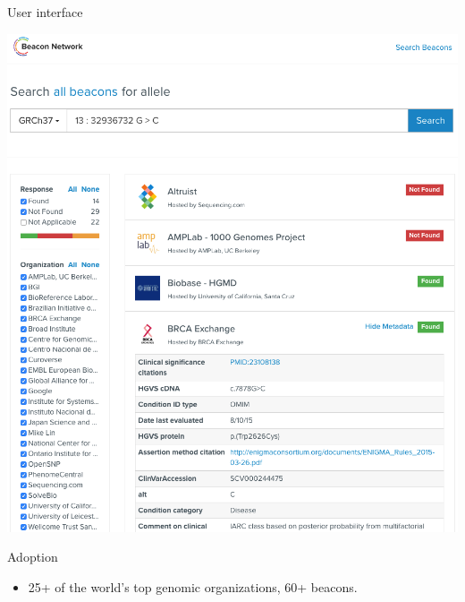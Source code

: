 \documentclass{beamer}
\begin{document}
\begin{frame}[fragile]
\begin{columns}[T]
\begin{column}{.46\textwidth}
\begin{block}{User interface\hfill{}}
\begin{center}
\includegraphics[width=\linewidth]{img/client-long.png}
\vspace{-2mm}
\end{center}
\end{block}

\begin{block}{Adoption\hfill{}}
\begin{itemize}
\item 25+ of the world's top genomic organizations, 60+ beacons.


\end{itemize}
\end{block}
\end{column}
\end{columns}
\end{frame}
\end{document}
